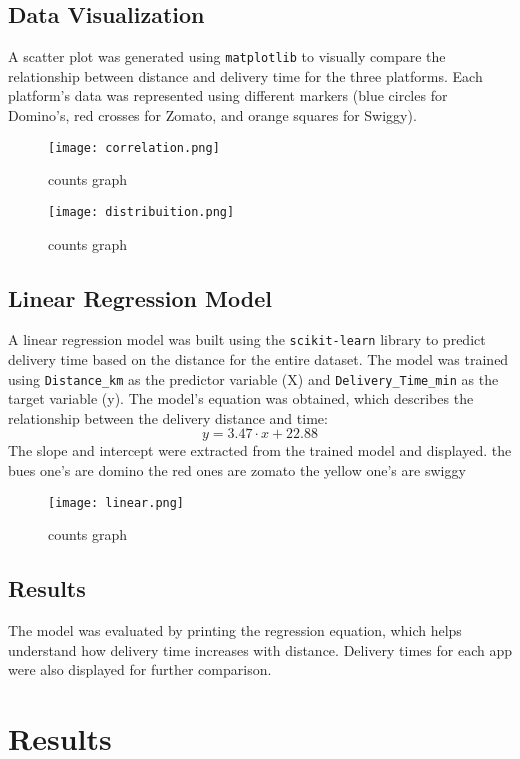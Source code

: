 \documentclass[12pt]{article}
\begin{document}
\subsection*{Data Visualization}
A scatter plot was generated using \texttt{matplotlib} to visually compare the relationship between distance and delivery time for the three platforms. Each platform’s data was represented using different markers (blue circles for Domino’s, red crosses for Zomato, and orange squares for Swiggy).
\begin{figure}[h]
    \centering
    \texttt{[image: correlation.png]}
    \caption{counts graph}
    \label{fig:label}
\end{figure}
\begin{figure}[h]
    \centering
    \texttt{[image: distribuition.png]}
    \caption{counts graph}
    \label{fig:label}
\end{figure}
\subsection*{Linear Regression Model}
A linear regression model was built using the \texttt{scikit-learn} library to predict delivery time based on the distance for the entire dataset. The model was trained using \texttt{Distance\_km} as the predictor variable (X) and \texttt{Delivery\_Time\_min} as the target variable (y). The model's equation was obtained, which describes the relationship between the delivery distance and time:
\[
y = \text{3.47} \cdot x + \text{22.88}
\]
The slope and intercept were extracted from the trained model and displayed.
the bues one's are domino the red ones are zomato the yellow one's are swiggy
\begin{figure}[h]
    \centering
    \texttt{[image: linear.png]}
    \caption{counts graph}
    \label{fig:label}
\end{figure}
\subsection*{Results}
The model was evaluated by printing the regression equation, which helps understand how delivery time increases with distance. Delivery times for each app were also displayed for further comparison.

\section*{Results}
\end{document}
